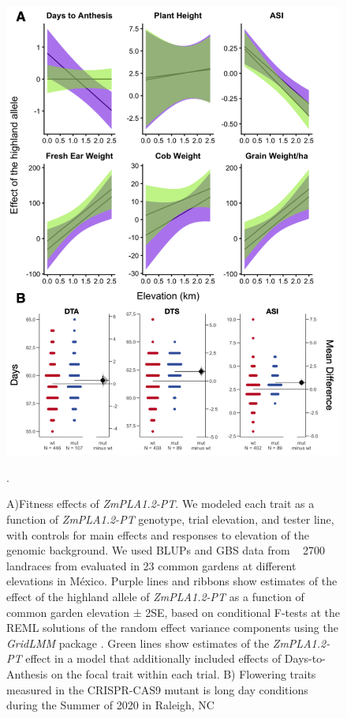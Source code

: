 \documentclass[9pt,twocolumn,twoside]{BioRxiv}
\begin{document}
\begin{figure}[!h]
\begin{center}
\includegraphics[width=0.4\paperwidth]{Figures/Fig_6.png}
\caption{A)Fitness effects of \textit{ZmPLA1.2-PT}. 
We modeled each trait as a function of \textit{ZmPLA1.2-PT} genotype, trial elevation, and tester line, with controls for main effects and responses to elevation of the genomic background. 
We used BLUPs and GBS data from ~ 2700 landraces from \cite{Gates2019-xu} evaluated in 23 common gardens at different elevations in México. 
Purple lines and ribbons show estimates of the effect of the highland allele of \textit{ZmPLA1.2-PT} as a function of common garden elevation ± 2SE, based on conditional F-tests at the REML solutions of the random effect variance components using the \textit{GridLMM} package \cite{Runcie2019-Gr}. 
Green lines show estimates of the \textit{ZmPLA1.2-PT} effect in a model that additionally included effects of Days-to-Anthesis on the focal trait within each trial.
B) Flowering traits measured in the CRISPR-CAS9 mutant is long day conditions during the Summer of 2020 in Raleigh, NC}. 
\label{Fig6}
\end{center}
\end{figure}
\end{document}
